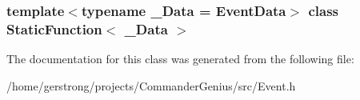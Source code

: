 \subsubsection*{template$<$typename \_\-Data = EventData$>$ class StaticFunction$<$ \_\-Data $>$}



The documentation for this class was generated from the following file:\begin{DoxyCompactItemize}
\item 
/home/gerstrong/projects/CommanderGenius/src/Event.h\end{DoxyCompactItemize}
